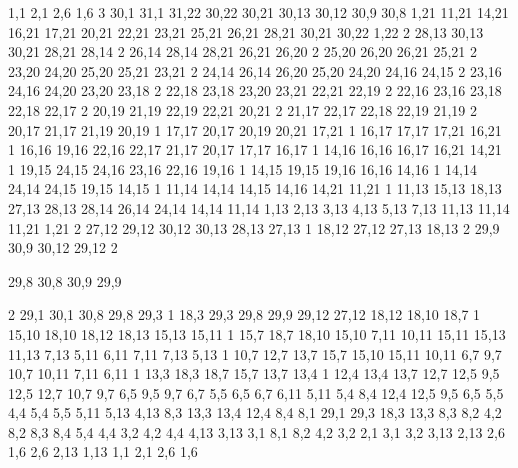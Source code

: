%
1,1
2,1
2,6
1,6
3%
30,1
31,1
31,22
30,22
30,21
30,13
30,12
30,9
30,8
%
1,21
11,21
14,21
16,21
17,21
20,21
22,21
23,21
25,21
26,21
28,21
30,21
30,22
1,22
2%
28,13
30,13
30,21
28,21
28,14
2%
26,14
28,14
28,21
26,21
26,20
2%
25,20
26,20
26,21
25,21
2%
23,20
24,20
25,20
25,21
23,21
2%
24,14
26,14
26,20
25,20
24,20
24,16
24,15
2%
23,16
24,16
24,20
23,20
23,18
2%
22,18
23,18
23,20
23,21
22,21
22,19
2%
22,16
23,16
23,18
22,18
22,17
2%
20,19
21,19
22,19
22,21
20,21
2%
21,17
22,17
22,18
22,19
21,19
2%
20,17
21,17
21,19
20,19
1%
17,17
20,17
20,19
20,21
17,21
1%
16,17
17,17
17,21
16,21
1%
16,16
19,16
22,16
22,17
21,17
20,17
17,17
16,17
1%
14,16
16,16
16,17
16,21
14,21
1%
19,15
24,15
24,16
23,16
22,16
19,16
1%
14,15
19,15
19,16
16,16
14,16
1%
14,14
24,14
24,15
19,15
14,15
1%
11,14
14,14
14,15
14,16
14,21
11,21
1%
11,13
15,13
18,13
27,13
28,13
28,14
26,14
24,14
14,14
11,14
%
1,13
2,13
3,13
4,13
5,13
7,13
11,13
11,14
11,21
1,21
2%
27,12
29,12
30,12
30,13
28,13
27,13
1%
18,12
27,12
27,13
18,13
2%
29,9
30,9
30,12
29,12
2%

29,8
30,8
30,9
29,9

2%
29,1
30,1
30,8
29,8
29,3
1%
18,3
29,3
29,8
29,9
29,12
27,12
18,12
18,10
18,7
1%
15,10
18,10
18,12
18,13
15,13
15,11
1%
15,7
18,7
18,10
15,10
%
7,11
10,11
15,11
15,13
11,13
7,13
%
5,11
6,11
7,11
7,13
5,13
1%
10,7
12,7
13,7
15,7
15,10
15,11
10,11
%
6,7
9,7
10,7
10,11
7,11
6,11
1%
13,3
18,3
18,7
15,7
13,7
13,4
1%
12,4
13,4
13,7
12,7
12,5
%
9,5
12,5
12,7
10,7
9,7
%
6,5
9,5
9,7
6,7
%
5,5
6,5
6,7
6,11
5,11
%
5,4
8,4
12,4
12,5
9,5
6,5
5,5
%
4,4
5,4
5,5
5,11
5,13
4,13
%
8,3
13,3
13,4
12,4
8,4
%
8,1
29,1
29,3
18,3
13,3
8,3
8,2
%
4,2
8,2
8,3
8,4
5,4
4,4
%
3,2
4,2
4,4
4,13
3,13
%
3,1
8,1
8,2
4,2
3,2
%
2,1
3,1
3,2
3,13
2,13
2,6
%
1,6
2,6
2,13
1,13
%
1,1
2,1
2,6
1,6